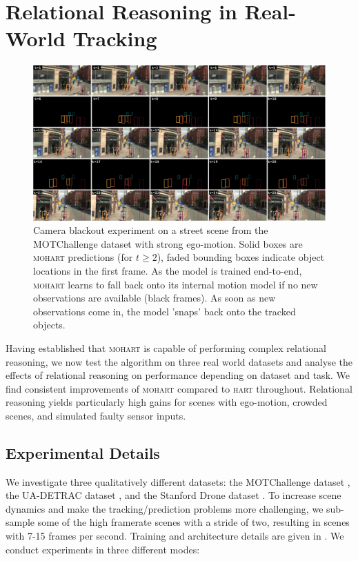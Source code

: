 \section{Relational Reasoning in Real-World Tracking}
\label{sec:experiment_real}

\begin{figure}[t!]
	\centering
	\includegraphics[width=1.0\textwidth]{figures/MOHART/mot_example2.png}
	\vspace{-6mm}
	\caption{Camera blackout experiment on a street scene from the MOTChallenge dataset with strong ego-motion. Solid boxes are \textsc{mohart} predictions (for $t\geq 2$), faded bounding boxes indicate object locations in the first frame. As the model is trained end-to-end, \textsc{mohart} learns to fall back onto its internal motion model if no new observations are available (black frames). As soon as new observations come in, the model 'snaps' back onto the tracked objects.}
	\label{fig:blackout_main}
\end{figure}

Having established that \textsc{mohart} is capable of performing complex relational reasoning, we now test the algorithm on three real world datasets and analyse the effects of relational reasoning on performance depending on dataset and task. We find consistent improvements of \textsc{mohart} compared to \textsc{hart} throughout. Relational reasoning yields particularly high gains for scenes with ego-motion, crowded scenes, and simulated faulty sensor inputs.

\subsection{Experimental Details}
\label{sec:exp_details}

We investigate three qualitatively  different datasets: the MOTChallenge dataset \citep{Mot16}, the UA-DETRAC dataset \citep{Wen15}, and the Stanford Drone dataset \citep{Dronedataset}. To increase scene dynamics and make the tracking/prediction problems more challenging, we sub-sample some of the high framerate scenes with a stride of two, resulting in scenes with 7-15 frames per second. Training and architecture details are given in .
We conduct experiments in three different modes:


